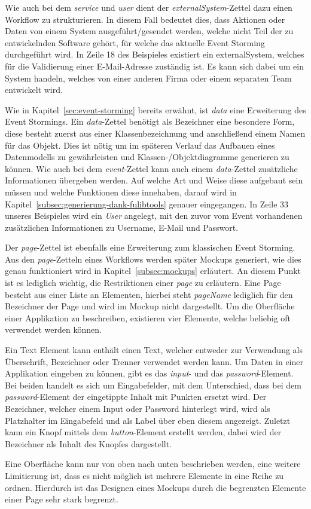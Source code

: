 
Wie auch bei dem \textit{service} und \textit{user} dient der \textit{externalSystem}-Zettel dazu einen Workflow zu strukturieren.
In diesem Fall bedeutet dies, dass Aktionen oder Daten von einem System ausgeführt/gesendet werden, welche nicht Teil der zu entwickelnden
Software gehört, für welche das aktuelle Event Storming durchgeführt wird.
In Zeile 18 des Beispieles existiert ein externalSystem, welches für die Validierung einer E-Mail-Adresse zuständig ist.
Es kann sich dabei um ein System handeln, welches von einer anderen Firma oder einem separaten Team entwickelt wird.


Wie in Kapitel~\ref{sec:event-storming} bereits erwähnt, ist \textit{data} eine Erweiterung des Event Stormings.
Ein \textit{data}-Zettel benötigt als Bezeichner eine besondere Form, diese besteht zuerst aus einer Klassenbezeichnung und anschließend einem Namen für das Objekt.
Dies ist nötig um im späteren Verlauf das Aufbauen eines Datenmodells zu gewährleisten und Klassen-/Objektdiagramme generieren zu können.
Wie auch bei dem \textit{event}-Zettel kann auch einem \textit{data}-Zettel zusätzliche Informationen übergeben werden.
Auf welche Art und Weise diese aufgebaut sein müssen und welche Funktionen diese innehaben, darauf wird in Kapitel~\ref{subsec:generierung-dank-fulibtools} genauer eingegangen.
In Zeile 33 unseres Beispieles wird ein \textit{User} angelegt, mit den zuvor vom Event vorhandenen zusätzlichen Informationen zu Username, E-Mail und Passwort.


Der \textit{page}-Zettel ist ebenfalls eine Erweiterung zum klassischen Event Storming.
Aus den \textit{page}-Zetteln eines Workflows werden später Mockups generiert, wie dies genau funktioniert wird in Kapitel~\ref{subsec:mockups} erläutert.
An diesem Punkt ist es lediglich wichtig, die Restriktionen einer \textit{page} zu erläutern.
Eine Page besteht aus einer Liste an Elementen, hierbei steht \textit{pageName} lediglich für den Bezeichner der Page und wird im Mockup nicht dargestellt.
Um die Oberfläche einer Applikation zu beschreiben, existieren vier Elemente, welche beliebig oft verwendet werden können.

Ein Text Element kann enthält einen Text, welcher entweder zur Verwendung als Überschrift, Bezeichner oder Trenner verwendet werden kann.
Um Daten in einer Applikation eingeben zu können, gibt es das \textit{input}- und das \textit{password}-Element.
Bei beiden handelt es sich um Eingabefelder, mit dem Unterschied, dass bei dem \textit{password}-Element der eingetippte Inhalt mit Punkten ersetzt wird.
Der Bezeichner, welcher einem Input oder Password hinterlegt wird, wird als Platzhalter im Eingabefeld und als Label über eben diesem angezeigt.
Zuletzt kann ein Knopf mittels dem \textit{button}-Element erstellt werden, dabei wird der Bezeichner als Inhalt des Knopfes dargestellt.

Eine Oberfläche kann nur von oben nach unten beschrieben werden, eine weitere Limitierung ist, dass es nicht möglich ist mehrere Elemente in eine Reihe zu ordnen.
Hierdurch ist das Designen eines Mockups durch die begrenzten Elemente einer Page sehr stark begrenzt.
